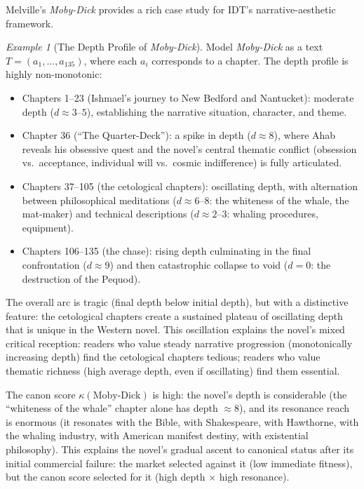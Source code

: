\documentclass[11pt,openany]{book}
\theoremstyle{definition}
\theoremstyle{plain}
\theoremstyle{remark}
\newtheorem{example}[axiom]{Example}
\begin{document}
Melville's \emph{Moby-Dick} provides a rich case study for IDT's narrative-aesthetic framework.

\begin{example}[The Depth Profile of \emph{Moby-Dick}]
Model \emph{Moby-Dick} as a text $T = (a_1, \ldots, a_{135})$, where each $a_i$ corresponds to a chapter. The depth profile is highly non-monotonic:

\begin{itemize}
\item Chapters 1--23 (Ishmael's journey to New Bedford and Nantucket): moderate depth ($d \approx 3$--$5$), establishing the narrative situation, character, and theme.
\item Chapter 36 (``The Quarter-Deck''): a spike in depth ($d \approx 8$), where Ahab reveals his obsessive quest and the novel's central thematic conflict (obsession vs.\ acceptance, individual will vs.\ cosmic indifference) is fully articulated.
\item Chapters 37--105 (the cetological chapters): oscillating depth, with alternation between philosophical meditations ($d \approx 6$--$8$: the whiteness of the whale, the mat-maker) and technical descriptions ($d \approx 2$--$3$: whaling procedures, equipment).
\item Chapters 106--135 (the chase): rising depth culminating in the final confrontation ($d \approx 9$) and then catastrophic collapse to void ($d = 0$: the destruction of the Pequod).
\end{itemize}

The overall arc is tragic (final depth below initial depth), but with a distinctive feature: the cetological chapters create a sustained plateau of oscillating depth that is unique in the Western novel. This oscillation explains the novel's mixed critical reception: readers who value steady narrative progression (monotonically increasing depth) find the cetological chapters tedious; readers who value thematic richness (high average depth, even if oscillating) find them essential.

The canon score $\kappa(\text{Moby-Dick})$ is high: the novel's depth is considerable (the ``whiteness of the whale'' chapter alone has depth $\approx 8$), and its resonance reach is enormous (it resonates with the Bible, with Shakespeare, with Hawthorne, with the whaling industry, with American manifest destiny, with existential philosophy). This explains the novel's gradual ascent to canonical status after its initial commercial failure: the market selected against it (low immediate fitness), but the canon score selected for it (high depth $\times$ high resonance).
\end{example}
\end{document}
